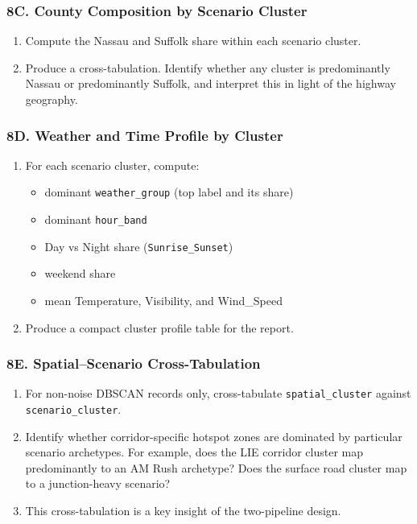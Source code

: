 \documentclass[11pt]{article}
\begin{document}
\subsubsection*{8C. County Composition by Scenario Cluster}

\begin{enumerate}
  \item Compute the Nassau and Suffolk share within each scenario cluster.
  \item Produce a cross-tabulation. Identify whether any cluster is predominantly Nassau or predominantly Suffolk, and interpret this in light of the highway geography.
\end{enumerate}

\subsubsection*{8D. Weather and Time Profile by Cluster}

\begin{enumerate}
  \item For each scenario cluster, compute:
  \begin{itemize}
    \item dominant \texttt{weather\_group} (top label and its share)
    \item dominant \texttt{hour\_band}
    \item Day vs Night share (\texttt{Sunrise\_Sunset})
    \item weekend share
    \item mean Temperature, Visibility, and Wind\_Speed
  \end{itemize}
  \item Produce a compact cluster profile table for the report.
\end{enumerate}

\subsubsection*{8E. Spatial--Scenario Cross-Tabulation}

\begin{enumerate}
  \item For non-noise DBSCAN records only, cross-tabulate \texttt{spatial\_cluster} against \texttt{scenario\_cluster}.
  \item Identify whether corridor-specific hotspot zones are dominated by particular scenario archetypes. For example, does the LIE corridor cluster map predominantly to an AM Rush archetype? Does the surface road cluster map to a junction-heavy scenario?
  \item This cross-tabulation is a key insight of the two-pipeline design.
\end{enumerate}
\end{document}
